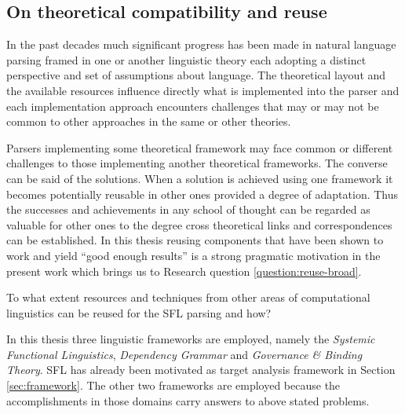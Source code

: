 
\subsection{On theoretical compatibility and reuse}
\label{sec:reuse}
In the past decades much significant progress has been made in natural language parsing framed in one or another linguistic theory each adopting a distinct perspective and set of assumptions about language. The theoretical layout and the available resources influence directly what is implemented into the parser and each implementation approach encounters challenges that may or may not be common to other approaches in the same or other theories. 

Parsers implementing some theoretical framework may face common or different challenges to those implementing another theoretical frameworks. The converse can be said of the solutions. When a solution is achieved using one framework it becomes potentially reusable in other ones provided a degree of adaptation. Thus the successes and achievements in any school of thought can be regarded as valuable for other ones to the degree cross theoretical links and correspondences can be established. In this thesis reusing components that have been shown to work and yield ``good enough results'' is a strong pragmatic motivation in the present work which brings us to Research question \ref{question:reuse-broad}.

\begin{question}\label{question:reuse-broad}
    To what extent resources and techniques from other areas of computational linguistics can be reused for the SFL parsing and how?
\end{question}

In this thesis three linguistic frameworks are employed, namely the \textit{Systemic Functional Linguistics}, \textit{Dependency Grammar} and \textit{Governance \& Binding Theory}. SFL has already been motivated as target analysis framework in Section \ref{sec:framework}. The other two frameworks are employed because the accomplishments in those domains carry answers to above stated problems. %

